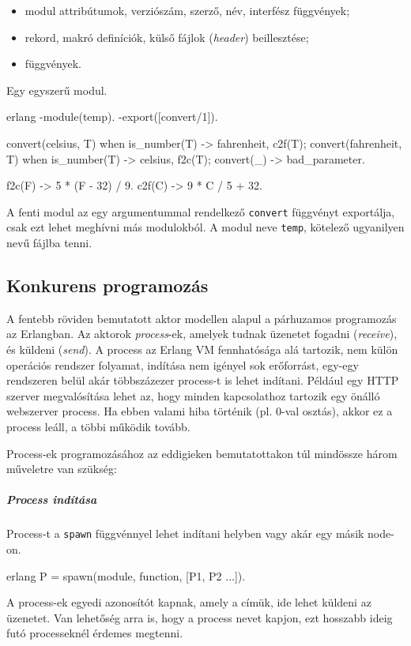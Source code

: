 \documentclass[12pt, a4paper, oneside]{book}
\begin{document}
\begin{itemize}
\item modul attribútumok, verziószám, szerző, név, interfész függvények;
\item rekord, makró definíciók, külső fájlok (\emph{header}) beillesztése;
\item függvények.
\end{itemize}

\noindent Egy egyszerű modul.

\begin{code}{erlang}{}
-module(temp).
-export([convert/1]).

convert({celsius, T}) when is_number(T) ->
  {fahrenheit, c2f(T)};
convert({fahrenheit, T}) when is_number(T) ->
  {celsius, f2c(T)};
convert(_) ->
  bad_parameter.

f2c(F) ->
  5 * (F - 32) / 9.
c2f(C) ->
  9 * C / 5 + 32.
\end{code}

A fenti modul az egy argumentummal rendelkező \texttt{convert} függvényt
exportálja, csak ezt lehet meghívni más modulokból. A modul neve \texttt{temp},
kötelező ugyanilyen nevű fájlba tenni.

\subsection{Konkurens programozás}
A fentebb röviden bemutatott aktor modellen alapul a párhuzamos
programozás az Erlangban. Az aktorok \emph{process}-ek, amelyek tudnak üzenetet
fogadni (\emph{receive}), és küldeni (\emph{send}). A process az Erlang VM
fennhatósága alá tartozik, nem külön operációs rendszer folyamat, indítása nem
igényel sok erőforrást, egy-egy rendszeren belül akár többszázezer process-t
is lehet indítani. Például egy HTTP szerver megvalósítása lehet az, hogy minden
kapcsolathoz tartozik egy önálló webszerver process. Ha ebben valami hiba
történik (pl. 0-val osztás), akkor ez a process leáll, a többi működik tovább.

Process-ek programozásához az eddigieken bemutatottakon túl mindössze három
műveletre van szükség:

\subparagraph{Process indítása} Process-t a \texttt{spawn} függvénnyel lehet
indítani helyben vagy akár egy másik node-on.
\begin{code}{erlang}{}
 P = spawn(module, function, [P1, P2 ...]).
\end{code}

\noindent A process-ek egyedi azonosítót kapnak, amely a címük, ide lehet
küldeni az üzenetet. Van lehetőség arra is, hogy a process nevet kapjon, ezt
hosszabb ideig futó processeknél érdemes megtenni.
\end{document}
